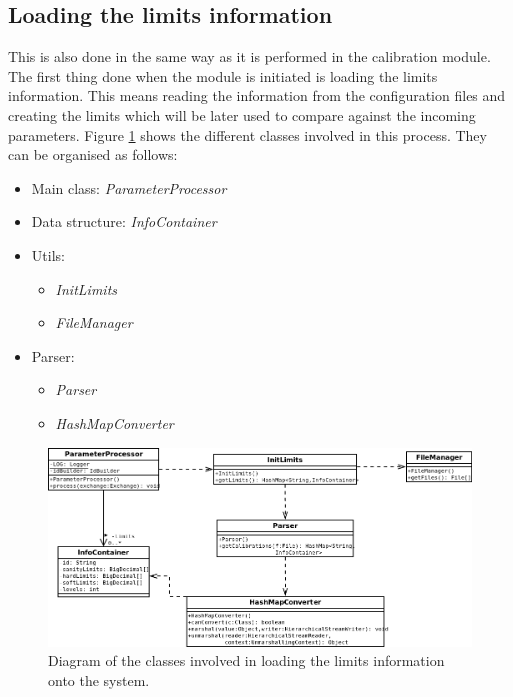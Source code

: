 \subsection{Loading the limits information}
This is also done in the same way as it is performed in the calibration module. The first thing done when the module is initiated is loading the limits information. This means reading the information from the configuration files and creating the limits which will be later used to compare against the incoming parameters.
Figure \ref{f5.8} shows the different classes involved in this process. They can be organised as follows:
\begin{itemize}
\item Main class: \emph{ParameterProcessor}
\item Data structure: \emph{InfoContainer}
\item Utils:
	\begin{itemize}
		\item \emph{InitLimits}
		\item \emph{FileManager}
	\end{itemize}
\item Parser:
	\begin{itemize}
		\item \emph{Parser}
		\item \emph{HashMapConverter}
	\end{itemize}
\end{itemize}

\begin{figure}[H]
\centerline{\includegraphics[width=1.1\textwidth]{images/LoadLimitsClassDiagram.png}}
\caption{Diagram of the classes involved in loading the limits information onto the system.}
\label{f5.8}
\end{figure}
\pagebreak


